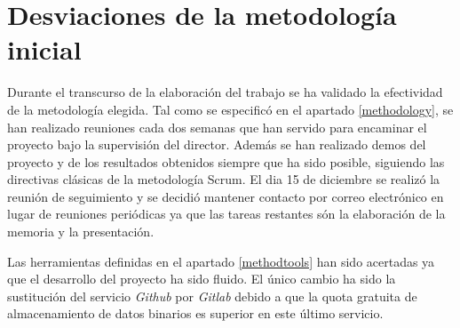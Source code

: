 \section{Desviaciones de la metodología inicial}\label{desvmethod}
Durante el transcurso de la elaboración del trabajo se ha validado la efectividad de la metodología elegida.
Tal como se especificó en el apartado \ref{methodology}, se han realizado reuniones cada dos semanas que han servido para encaminar el proyecto bajo la supervisión del director. Además se han realizado demos del proyecto y de los resultados obtenidos siempre que ha sido posible, siguiendo las directivas clásicas de la metodología Scrum.
El dia 15 de diciembre se realizó la reunión de seguimiento y se decidió mantener contacto por correo electrónico en lugar de reuniones periódicas ya que las tareas restantes són la elaboración de la memoria y la presentación.

Las herramientas definidas en el apartado \ref{methodtools} han sido acertadas ya que el desarrollo del proyecto ha sido fluido. El único cambio ha sido la sustitución del servicio \textit{Github} por \textit{Gitlab} debido a que la quota gratuita de almacenamiento de datos binarios es superior en este último servicio.
